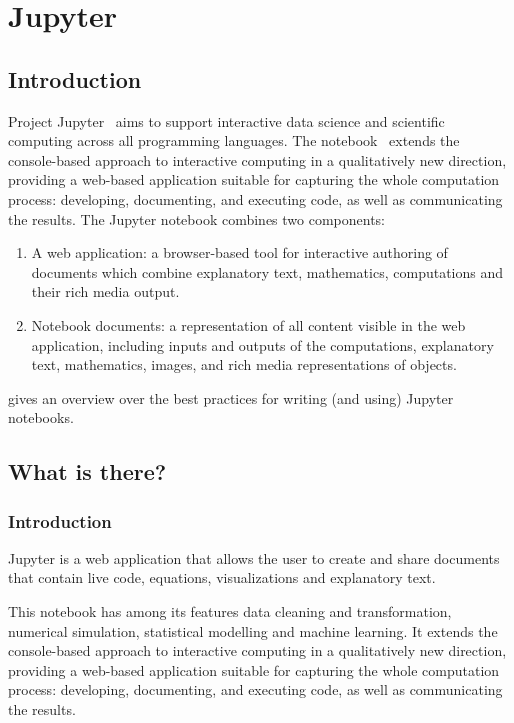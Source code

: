 \section{Jupyter}\label{sec:jupyter}

\subsection{Introduction}

Project Jupyter~\cite{jupyter-project:on,jupyter-doc:on,jupyter-git:on} aims to support
interactive data science and scientific computing across all programming languages. The
notebook~\cite{jupyter-notebook:on} extends the console-based approach to interactive
computing in a qualitatively new direction, providing a web-based application suitable for
capturing the whole computation process: developing, documenting, and executing code, as
well as communicating the results. The Jupyter notebook combines two components:
\begin{enumerate}
\item A web application: a browser-based tool for interactive authoring of documents which
  combine explanatory text, mathematics, computations and their rich media output.
\item Notebook documents: a representation of all content visible in the web application,
  including inputs and outputs of the computations, explanatory text, mathematics, images,
  and rich media representations of objects.
\end{enumerate}
\cite{juplit:on} gives an overview over the best practices for writing (and using)
Jupyter notebooks.

\subsection{What is there?}\label{sec:intro}

\subsubsection{Introduction}
Jupyter is a web application that allows the user to create and share documents that
contain live code, equations, visualizations and explanatory text.

This notebook has among its features data cleaning and transformation, numerical
simulation, statistical modelling and machine learning. It extends the console-based
approach to interactive computing in a qualitatively new direction, providing a web-based
application suitable for capturing the whole computation process: developing, documenting,
and executing code, as well as communicating the results.

